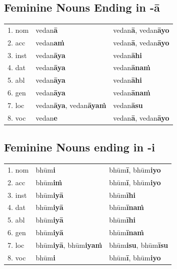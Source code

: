 \documentclass[11pt,oneside]{memoir}
\begin{document}
\clearpage

\subsection{Feminine Nouns Ending in -ā}
\label{sec:org4730bb6}

\begin{center}
\begin{tabular}{lll}
1. nom & vedan\textbf{ā} & vedan\textbf{ā}, vedan\textbf{āyo}\\[0pt]
2. acc & vedan\textbf{aṁ} & vedan\textbf{ā}, vedan\textbf{āyo}\\[0pt]
3. inst & vedan\textbf{āya} & vedan\textbf{āhi}\\[0pt]
4. dat & vedan\textbf{āya} & vedan\textbf{ānaṁ}\\[0pt]
5. abl & vedan\textbf{āya} & vedan\textbf{āhi}\\[0pt]
6. gen & vedan\textbf{āya} & vedan\textbf{ānaṁ}\\[0pt]
7. loc & vedan\textbf{āya}, vedan\textbf{āyaṁ} & vedan\textbf{āsu}\\[0pt]
8. voc & vedan\textbf{e} & vedan\textbf{ā}, vedan\textbf{āyo}\\[0pt]
\end{tabular}
\end{center}

\subsection{Feminine Nouns ending in -i}
\label{sec:org279f5db}

\begin{center}
\begin{tabular}{lll}
1. nom & bhūm\textbf{i} & bhūm\textbf{ī}, bhūm\textbf{iyo}\\[0pt]
2. acc & bhūm\textbf{iṁ} & bhūm\textbf{ī}, bhūm\textbf{iyo}\\[0pt]
3. inst & bhūm\textbf{iyā} & bhūm\textbf{īhi}\\[0pt]
4. dat & bhūm\textbf{iyā} & bhūm\textbf{īnaṁ}\\[0pt]
5. abl & bhūm\textbf{iyā} & bhūm\textbf{īhi}\\[0pt]
6. gen & bhūm\textbf{iyā} & bhūm\textbf{īnaṁ}\\[0pt]
7. loc & bhūm\textbf{iyā}, bhūm\textbf{iyaṁ} & bhūm\textbf{isu}, bhūm\textbf{īsu}\\[0pt]
8. voc & bhūm\textbf{i} & bhūm\textbf{ī}, bhūm\textbf{iyo}\\[0pt]
\end{tabular}
\end{center}
\end{document}

